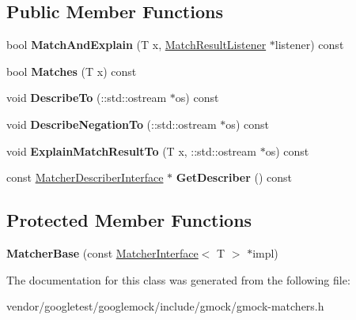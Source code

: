 \subsection*{Public Member Functions}
\begin{DoxyCompactItemize}
\item 
\mbox{\label{classtesting_1_1internal_1_1_matcher_base_a08429a6d7e7d330de4a4eb4e272105a7}} 
bool {\bfseries Match\+And\+Explain} (T x, \mbox{\hyperlink{classtesting_1_1_match_result_listener}{Match\+Result\+Listener}} $\ast$listener) const
\item 
\mbox{\label{classtesting_1_1internal_1_1_matcher_base_a3b479673ff40cac1a7d548e91d789cb2}} 
bool {\bfseries Matches} (T x) const
\item 
\mbox{\label{classtesting_1_1internal_1_1_matcher_base_a7e0c883c7745e0d646463077ef1c1267}} 
void {\bfseries Describe\+To} (\+::std\+::ostream $\ast$os) const
\item 
\mbox{\label{classtesting_1_1internal_1_1_matcher_base_ac1089d49b6b8a381900618985cd69b7f}} 
void {\bfseries Describe\+Negation\+To} (\+::std\+::ostream $\ast$os) const
\item 
\mbox{\label{classtesting_1_1internal_1_1_matcher_base_ad7815191a01d24e20eda2e0057d33aa3}} 
void {\bfseries Explain\+Match\+Result\+To} (T x, \+::std\+::ostream $\ast$os) const
\item 
\mbox{\label{classtesting_1_1internal_1_1_matcher_base_a9b816eb60ee16780703768d704c105e3}} 
const \mbox{\hyperlink{classtesting_1_1_matcher_describer_interface}{Matcher\+Describer\+Interface}} $\ast$ {\bfseries Get\+Describer} () const
\end{DoxyCompactItemize}
\subsection*{Protected Member Functions}
\begin{DoxyCompactItemize}
\item 
\mbox{\label{classtesting_1_1internal_1_1_matcher_base_aed3e080f12ea7bde535ddf02b6f66922}} 
{\bfseries Matcher\+Base} (const \mbox{\hyperlink{classtesting_1_1_matcher_interface}{Matcher\+Interface}}$<$ T $>$ $\ast$impl)
\end{DoxyCompactItemize}


The documentation for this class was generated from the following file\+:\begin{DoxyCompactItemize}
\item 
vendor/googletest/googlemock/include/gmock/gmock-\/matchers.\+h\end{DoxyCompactItemize}
